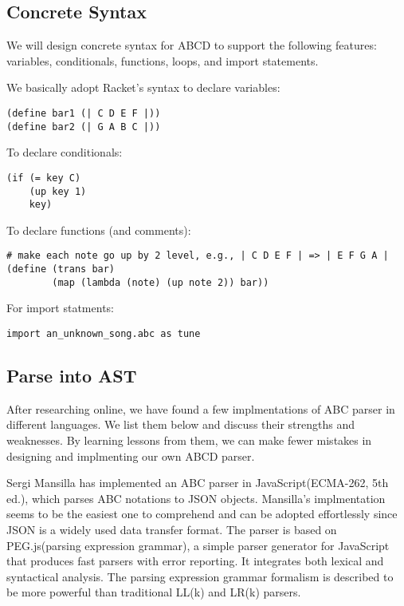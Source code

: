 \subsection{Concrete Syntax}

We will design concrete syntax for ABCD to support the following features: variables, conditionals, functions, loops, and import statements.

We basically adopt Racket's syntax to declare variables:
\begin{verbatim}
(define bar1 (| C D E F |))
(define bar2 (| G A B C |))
\end{verbatim}

To declare conditionals:
\begin{verbatim}
(if (= key C)
    (up key 1)
    key)
\end{verbatim}

To declare functions (and comments):
\begin{verbatim}
# make each note go up by 2 level, e.g., | C D E F | => | E F G A |
(define (trans bar)
        (map (lambda (note) (up note 2)) bar))
\end{verbatim}

For import statments:
\begin{verbatim}
import an_unknown_song.abc as tune
\end{verbatim}


\subsection{Parse into AST}

After researching online, we have found a few implmentations of ABC parser in different languages. We list them below and discuss their strengths and weaknesses. By learning lessons from them, we can make fewer mistakes in designing and implmenting our own ABCD parser.

Sergi Mansilla has implemented an ABC parser in JavaScript(ECMA-262, 5th ed.), which parses ABC notations to JSON objects\cite{Mansilla12}. Mansilla's implmentation seems to be the easiest one to comprehend and can be adopted effortlessly since JSON is a widely used data transfer format. The parser is based on PEG.js(parsing expression grammar), a simple parser generator for JavaScript that produces fast parsers with error reporting\cite{Ryuu17}. It integrates both lexical and syntactical analysis. The parsing expression grammar formalism is described to be more powerful than traditional LL(k) and LR(k) parsers. 

